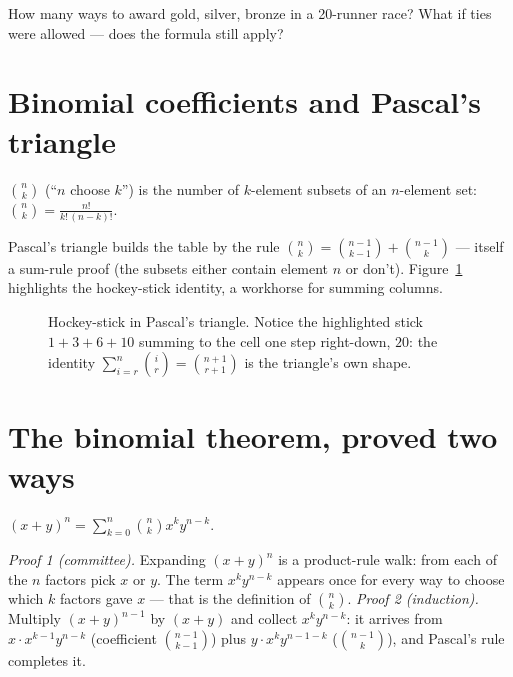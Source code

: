 \begin{exercise}[easy]\label{exr:perm}
How many ways to award gold, silver, bronze in a 20-runner race? What if
ties were allowed --- does the formula still apply?
\end{exercise}

\section{Binomial coefficients and Pascal's triangle}\label{sec:binom}

\begin{definition}
$\binom{n}{k}$ (``$n$ choose $k$'') is the number of $k$-element subsets
of an $n$-element set: $\binom{n}{k} = \frac{n!}{k!\,(n-k)!}$.
\end{definition}

Pascal's triangle builds the table by the rule
$\binom{n}{k} = \binom{n-1}{k-1} + \binom{n-1}{k}$ --- itself a sum-rule
proof (the subsets either contain element $n$ or don't).
Figure~\ref{fig:pascal} highlights the hockey-stick identity, a workhorse
for summing columns.

\begin{figure}[ht]\centering

\caption{Hockey-stick in Pascal's triangle. Notice the highlighted stick
$1+3+6+10$ summing to the cell one step right-down, $20$: the identity
$\sum_{i=r}^{n}\binom{i}{r} = \binom{n+1}{r+1}$ is the triangle's own
shape.}
\label{fig:pascal}
\end{figure}

\section{The binomial theorem, proved two ways}\label{sec:binthm}

\begin{theorem}
$(x + y)^n = \sum_{k=0}^{n} \binom{n}{k} x^k y^{n-k}$.
\end{theorem}

\emph{Proof 1 (committee).} Expanding $(x+y)^n$ is a product-rule walk:
from each of the $n$ factors pick $x$ or $y$. The term $x^k y^{n-k}$
appears once for every way to choose which $k$ factors gave $x$ --- that
is the definition of $\binom{n}{k}$.
\emph{Proof 2 (induction).} Multiply $(x+y)^{n-1}$ by $(x+y)$ and collect
$x^k y^{n-k}$: it arrives from $x \cdot x^{k-1}y^{n-k}$ (coefficient
$\binom{n-1}{k-1}$) plus $y \cdot x^k y^{n-1-k}$ ($\binom{n-1}{k}$), and
Pascal's rule completes it.

